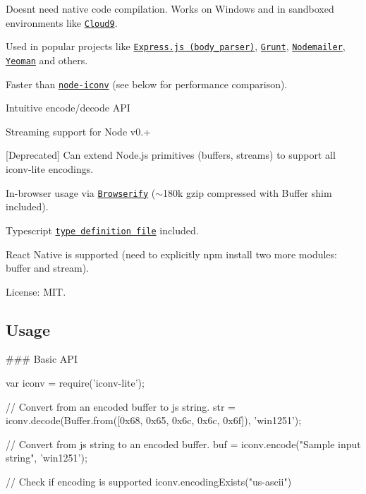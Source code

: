 
\begin{DoxyItemize}
\item Doesn\textquotesingle{}t need native code compilation. Works on Windows and in sandboxed environments like \href{http://c9.io}{\tt Cloud9}.
\item Used in popular projects like \href{https://github.com/expressjs/body-parser}{\tt Express.\+js (body\+\_\+parser)}, \href{http://gruntjs.com/}{\tt Grunt}, \href{http://www.nodemailer.com/}{\tt Nodemailer}, \href{http://yeoman.io/}{\tt Yeoman} and others.
\item Faster than \href{https://github.com/bnoordhuis/node-iconv}{\tt node-\/iconv} (see below for performance comparison).
\item Intuitive encode/decode A\+PI
\item Streaming support for Node v0.+
\item \mbox{[}Deprecated\mbox{]} Can extend Node.\+js primitives (buffers, streams) to support all iconv-\/lite encodings.
\item In-\/browser usage via \href{https://github.com/substack/node-browserify}{\tt Browserify} ($\sim$180k gzip compressed with Buffer shim included).
\item Typescript \href{https://github.com/ashtuchkin/iconv-lite/blob/master/lib/index.d.ts}{\tt type definition file} included.
\item React Native is supported (need to explicitly {\ttfamily npm install} two more modules\+: {\ttfamily buffer} and {\ttfamily stream}).
\item License\+: M\+IT.
\end{DoxyItemize}

\href{https://npmjs.org/packages/iconv-lite/}{\tt }

\subsection*{Usage}

\#\#\# Basic A\+PI 
\begin{DoxyCode}
var iconv = require('iconv-lite');

// Convert from an encoded buffer to js string.
str = iconv.decode(Buffer.from([0x68, 0x65, 0x6c, 0x6c, 0x6f]), 'win1251');

// Convert from js string to an encoded buffer.
buf = iconv.encode("Sample input string", 'win1251');

// Check if encoding is supported
iconv.encodingExists("us-ascii")
\end{DoxyCode}


